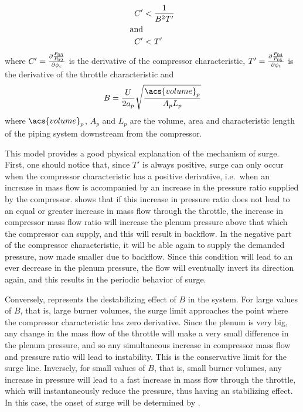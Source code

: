 \begin{align}
    C' &< \frac{1}{B^2 T'} \label{eqn:surge2} \\
\text{and} \notag \\
    C' &< T' \label{eqn:surge1}
\end{align}
where $C' = \frac{\partial \frac{P_{03}}{P_{02}}}{\partial \phi_c}$ is the derivative of the compressor characteristic, $T' = \frac{\partial \frac{P_{04}}{P_{05}}}{\partial \phi_t}$ is the derivative of the throttle characteristic and 
\begin{equation}
    B = \frac{U}{2a_p}\sqrt{\frac{\acs{volume}_p}{A_p L_p}}
\end{equation}
where $\acs{volume}_p$, $A_p$ and $L_p$ are the volume, area and characteristic length of the piping system downstream from the compressor.

This model provides a good physical explanation of the mechanism of surge. 
First, one should notice that, since $T'$ is always positive, surge can only occur when the compressor characteristic has a positive derivative, 
i.e.\ when an increase in mass flow is accompanied by an increase in the pressure ratio supplied by the compressor. 
 shows that if this increase in pressure ratio does not lead to an equal or greater increase in mass flow through the throttle, the increase in compressor mass flow ratio will increase the plenum pressure above that which the compressor can supply, and this will result in backflow. In the negative part of the compressor characteristic, it will be able again to supply the demanded pressure, now made smaller due to backflow. Since this condition will lead to an ever decrease in the plenum pressure, the flow will eventually invert its direction again, and this results in the periodic behavior of surge.

Conversely,  represents the destabilizing effect of $B$ in the system.
For large values of $B$, that is, large burner volumes, the surge limit approaches the point where the compressor characteristic has zero derivative. Since the plenum is very big, any change in the mass flow of the throttle will make a very small difference in the plenum pressure, and so any simultaneous increase in compressor mass flow and pressure ratio will lead to instability. This is the conservative limit for the surge line.
Inversely, for small values of $B$, that is, small burner volumes, any increase in pressure will lead to a fast increase in mass flow through the throttle, which will instantaneously reduce the pressure, thus having an stabilizing effect. 
In this case, the onset of surge will be determined by .

